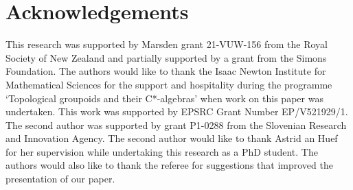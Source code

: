 \documentclass[11pt]{amsart}
\theoremstyle{definition}
\numberwithin{thm}{section}
\numberwithin{equation}{section}
\begin{document}
\section*{Acknowledgements}

This research was supported by Marsden grant 21-VUW-156 from the Royal 
Society of New Zealand and partially supported by a grant from the Simons 
Foundation. 
The authors would like to thank the Isaac Newton Institute for Mathematical 
Sciences for the support and hospitality during the programme `Topological 
groupoids and their C*-algebras' when work on this paper was undertaken. 
This work was supported by EPSRC Grant Number EP/V521929/1. 
The second author was supported by grant P1-0288 from the Slovenian Research 
and Innovation Agency. 
The second author would like to thank Astrid an Huef for her supervision 
while undertaking this research as a PhD student.
The authors would also like to thank the referee for suggestions that 
improved the presentation of our paper.
\end{document}
